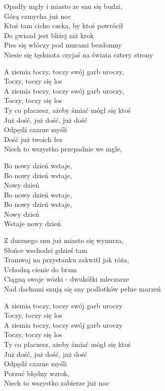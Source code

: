\begin{text}
    Opadły mgły i miasto ze snu się budzi,\\ 
    Górą czmycha już noc\\ 
    Ktoś tam cicho czeka, by ktoś powrócił\\ 
    Do gwiazd jest bliżej niż krok\\ 
    Pies się włóczy pod murami  bezdomny\\ 
    Niesie się tęsknota czyjaś na świata cztery strony

    \vin A ziemia toczy, toczy swój garb uroczy,\\ 
    \vin Toczy, toczy się los\\ 
    \vin A ziemia toczy, toczy swój garb uroczy,\\ 
    \vin Toczy, toczy się los\\ 
    \vin Ty co płaczesz, ażeby śmiać mógł się ktoś\\ 
    \vin Już dość, już dość, już dość\\ 
    \vin Odpędź czarne myśli\\ 
    \vin Dość już twoich łez\\ 
    \vin Niech to wszystko przepadnie we mgle,

    \vin Bo nowy dzień wstaje,\\ 
    \vin Bo nowy dzień wstaje,\\ 
    \vin Nowy dzień\\ 
    \vin Bo nowy dzień wstaje,\\ 
    \vin Bo nowy dzień wstaje,\\ 
    \vin Nowy dzień\\ 
    \vin Wstaje nowy dzień

    Z dusznego snu już miasto się wynurza,\\ 
    Słońce wschodzi gdzieś tam\\ 
    Tramwaj na przystanku zakwitł jak róża,\\ 
    Uchodzą cienie do bram\\ 
    Ciągną swoje wózki - dwukółki mleczarze\\ 
    Nad dachami snują się sny podlotków pełne marzeń

    \vin A ziemia toczy, toczy swój garb uroczy\\ 
    \vin Toczy, toczy się los\\ 
    \vin A ziemia toczy, toczy swój garb uroczy\\ 
    \vin Toczy, toczy się los\\ 
    \vin Ty co płaczesz, ażeby śmiać mógł się ktoś\\ 
    \vin Już dość, już dość, już dość\\ 
    \vin Odpędź czarne myśli\\ 
    \vin Porzuć błędny wzrok,\\ 
    \vin Niech to wszystko zabierze już noc


\end{text}
